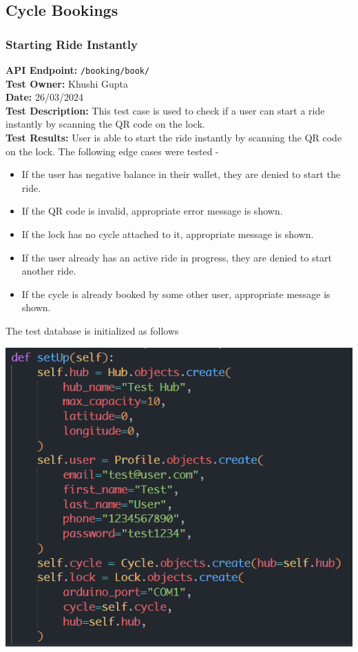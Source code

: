 \documentclass[11pt]{article}
\begin{document}
\subsection{Cycle Bookings}
\subsubsection{Starting Ride Instantly}
\textbf{API Endpoint: } \texttt{/booking/book/} \\
\textbf{Test Owner: } Khushi Gupta \\
\textbf{Date: } 26/03/2024 \\
\textbf{Test Description: } This test case is used to check if a user can start a ride instantly by scanning the QR code on the lock. \\
\textbf{Test Results: } User is able to start the ride instantly by scanning the QR code on the lock. The following edge cases were tested - 
\begin{itemize}
    \itemsep 0em
    \item If the user has negative balance in their wallet, they are denied to start the ride.
    \item If the QR code is invalid, appropriate error message is shown.
    \item If the lock has no cycle attached to it, appropriate message is shown.
    \item If the user already has an active ride in progress, they are denied to start another ride.
    \item If the cycle is already booked by some other user, appropriate message is shown.
\end{itemize}
The test database is initialized as follows
\begin{center}
    \includegraphics[scale=0.6]{unit_testing_codes/start_ride_setup.png}
\end{center}
\end{document}
